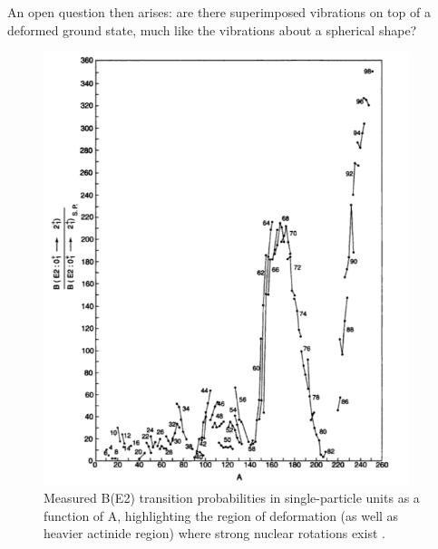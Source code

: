 An open question then arises: are there superimposed vibrations on top of a deformed ground state, much like the vibrations about a spherical shape?

\begin{figure}[h!]
\centering
\includegraphics[width=0.95\textwidth]{B(E2)_rotations_Casten.png}
\caption{Measured B(E2) transition probabilities in single-particle units as a function of A, highlighting the region of deformation (as well as heavier actinide region) where strong nuclear rotations exist \cite{Casten_text}. \label{fig:nucl_rotation}}
\end{figure}
\newpage




